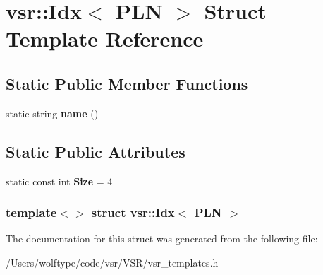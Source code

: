\hypertarget{structvsr_1_1_idx_3_01_p_l_n_01_4}{\section{vsr\-:\-:Idx$<$ P\-L\-N $>$ Struct Template Reference}
\label{structvsr_1_1_idx_3_01_p_l_n_01_4}
}
\subsection*{Static Public Member Functions}
\begin{DoxyCompactItemize}
\item 
\hypertarget{structvsr_1_1_idx_3_01_p_l_n_01_4_a3098f9fe2b39c71ec600cbf2972a52bc}{static string {\bfseries name} ()}\label{structvsr_1_1_idx_3_01_p_l_n_01_4_a3098f9fe2b39c71ec600cbf2972a52bc}

\end{DoxyCompactItemize}
\subsection*{Static Public Attributes}
\begin{DoxyCompactItemize}
\item 
\hypertarget{structvsr_1_1_idx_3_01_p_l_n_01_4_a4482a3bf28ecf5096956da6e27c587d6}{static const int {\bfseries Size} = 4}\label{structvsr_1_1_idx_3_01_p_l_n_01_4_a4482a3bf28ecf5096956da6e27c587d6}

\end{DoxyCompactItemize}
\subsubsection*{template$<$$>$ struct vsr\-::\-Idx$<$ P\-L\-N $>$}



The documentation for this struct was generated from the following file\-:\begin{DoxyCompactItemize}
\item 
/\-Users/wolftype/code/vsr/\-V\-S\-R/vsr\-\_\-templates.\-h\end{DoxyCompactItemize}
